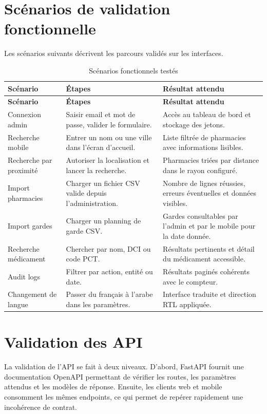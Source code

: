 \section{Scénarios de validation fonctionnelle}

Les scénarios suivants décrivent les parcours validés sur les interfaces.

\begin{longtable}{L{4cm}L{5cm}L{5cm}}
    \caption{Scénarios fonctionnels testés}\\
    \toprule
    \textbf{Scénario} & \textbf{Étapes} & \textbf{Résultat attendu} \\
    \midrule
    \endfirsthead
    \toprule
    \textbf{Scénario} & \textbf{Étapes} & \textbf{Résultat attendu} \\
    \midrule
    \endhead
    Connexion admin & Saisir email et mot de passe, valider le formulaire. & Accès au tableau de bord et stockage des jetons. \\
    Recherche mobile & Entrer un nom ou une ville dans l'écran d'accueil. & Liste filtrée de pharmacies avec informations lisibles. \\
    Recherche par proximité & Autoriser la localisation et lancer la recherche. & Pharmacies triées par distance dans le rayon configuré. \\
    Import pharmacies & Charger un fichier CSV valide depuis l'administration. & Nombre de lignes réussies, erreurs éventuelles et données visibles. \\
    Import gardes & Charger un planning de garde CSV. & Gardes consultables par l'admin et par le mobile pour la date donnée. \\
    Recherche médicament & Chercher par nom, DCI ou code PCT. & Résultats pertinents et détail du médicament accessible. \\
    Audit logs & Filtrer par action, entité ou date. & Résultats paginés cohérents avec le compteur. \\
    Changement de langue & Passer du français à l'arabe dans les paramètres. & Interface traduite et direction RTL appliquée. \\
    \bottomrule
\end{longtable}

\section{Validation des API}

La validation de l'API se fait à deux niveaux. D'abord, FastAPI fournit une documentation OpenAPI
permettant de vérifier les routes, les paramètres attendus et les modèles de réponse. Ensuite, les clients
web et mobile consomment les mêmes endpoints, ce qui permet de repérer rapidement une incohérence de
contrat.

